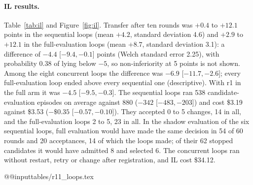 \documentclass[11pt]{article}
\begin{document}
\paragraph{IL results.} Table~\ref{tab:il} and Figure~\ref{fig:il}. Transfer after ten rounds was $+0.4$ to $+12.1$ points in the sequential loops (mean $+4.2$, standard deviation 4.6) and $+2.9$ to $+12.1$ in the full-evaluation loops (mean $+8.7$, standard deviation 3.1): a difference of $-4.4$ [$-9.4,-0.1$] points (Welch standard error 2.25), with probability 0.38 of lying below $-5$, so non-inferiority at 5 points is not shown. Among the eight concurrent loops the difference was $-6.9$ [$-11.7,-2.6$]; every full-evaluation loop ended above every sequential one (descriptive). With r1 in the full arm it was $-4.5$ [$-9.5,-0.3$]. The sequential loops ran 538 candidate-evaluation episodes on average against 880 ($-342$ [$-483,-203$]) and cost \$3.19 against \$3.53 ($-\$0.35$ [$-0.57,-0.10$]). They accepted 0 to 5 changes, 14 in all, and the full-evaluation loops 2 to 5, 23 in all. In the shadow evaluation of the six sequential loops, full evaluation would have made the same decision in 54 of 60 rounds and 20 acceptances, 14 of which the loops made; of their 62 stopped candidates it would have admitted 8 and selected 6. The concurrent loops ran without restart, retry or change after registration, and IL cost \$34.12.

\begin{table}[t]
\centering\small
\setlength{\tabcolsep}{4pt}
\csname @@input\endcsname tables/r11_loops.tex
\caption{Transfer after ten rounds on airline (points; held-out success after round 9 minus the base). Recorded: full and sequential evaluation's round values summed over rounds 0--9 of r1--r3, in full evaluation's states. Live: the registered comparison IL (sequential: cl1, cl2, s1--s4; full: r2, r3, f1--f4); historical loops ran before the eight concurrent ones. 90\% intervals: bootstrap of rounds or loops and of tasks; adjusted for the calibrated noise band $\delta$ by least squares (post hoc, $t$ intervals). Live minus recorded: one bootstrap that resamples loops, trajectories and tasks shared by both rows once (post hoc). Accepted changes and mean $\delta$ (points), sequential/full.}
\label{tab:loops}
\end{table}
\end{document}
